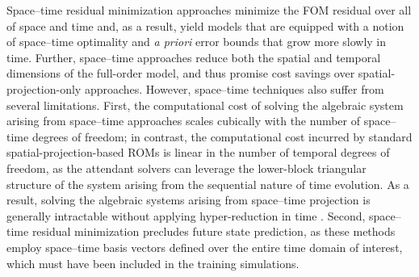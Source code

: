 \documentclass[3p,computermodern,10pt]{elsarticle}
\begin{document}

Space--time residual minimization approaches minimize the FOM residual over all of space and time and, as a result, yield models that are equipped with a notion of space--time optimality and \textit{a priori} error bounds that grow more slowly
in time. Further, space--time approaches reduce both the spatial and temporal dimensions of the full-order model, and thus promise cost savings over spatial-projection-only approaches.
However, space--time techniques also suffer from several
limitations. First, the computational cost of solving the algebraic system arising from space--time
approaches scales cubically with the number of space--time degrees of freedom;
in contrast, the computational cost incurred by standard
spatial-projection-based ROMs is linear in the number of temporal degrees of
freedom, as the attendant solvers can leverage the lower-block triangular
structure of the system arising from the sequential nature of time
evolution. As a result, solving the algebraic systems arising from space--time
projection is generally intractable without applying hyper-reduction in time
\cite{choi_stlspg,constantine_strom}. Second, space--time residual
minimization precludes future
state prediction, as these methods employ space--time basis vectors defined over the
entire time domain of interest, which must have been included in the training
simulations.
\end{document}
